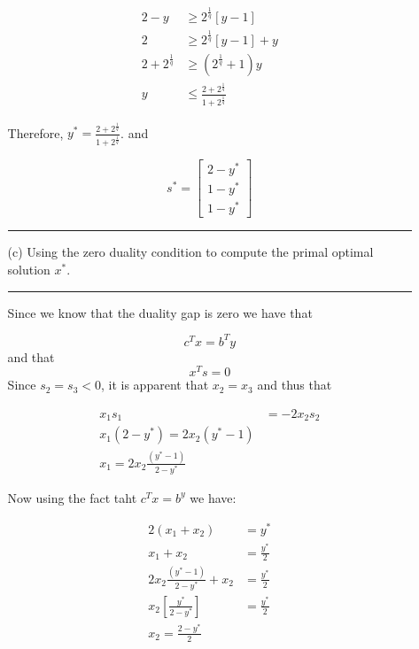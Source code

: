 \documentclass{article} %
\begin{document}
\begin{enumerate}
\begin{itemize}
\begin{equation*}
\begin{aligned}
2 - y &\geq 2^{\frac{1}{q}}[y - 1] \\ 
2 &\geq 2^{\frac{1}{q}}[y -1] + y \\ 
2 + 2^{\frac{1}{q}} &\geq (2^{\frac{1}{q}} + 1)y \\ 
y &\leq \frac{2 + 2^{\frac{1}{q}}}{1 + 2^{\frac{1}{q}}}
\end{aligned}
\end{equation*}

Therefore, $y^{*} = \frac{2 + 2^{\frac{1}{q}}}{1 + 2^{\frac{1}{q}}}$. and 

\[
s^{*} = \begin{bmatrix} 2 - y^{*} \\ 1 - y^{*} \\ 1 - y^{*}\end{bmatrix}
\]



\rule{\textwidth}{1pt}

\item[(c)] Using the zero duality condition to compute the primal optimal solution $x^*$.


\rule{\textwidth}{1pt}


Since we know that the duality gap is zero we have that 

\[
c^{T} x = b^{T} y
\]
and that 
\[
x^{T} s = 0
\]
Since $s_2 = s_3 < 0$, it is apparent that $x_2 = x_3$ and thus that 

\begin{equation*}
\begin{aligned}
x_1 s_1 &= -2 x_2 s_2 \\ 
x_1( 2- y^{*}) = 2 x_2 (y^{*} - 1) \\ 
x_1 = 2 x_2 \frac{(y^{*} - 1) }{ 2 - y^{*}}
\end{aligned}
\end{equation*}

Now using the fact taht $c^{T} x = b^y$ we have: 

\begin{equation*}
\begin{aligned}
2(x_1 + x_2) &= y^{*} \\ 
x_1 + x_2 &= \frac{y^{*}}{2} \\
2 x_2 \frac{(y^{*} - 1) }{ 2 - y^{*}} + x_2 &= \frac{y^{*}}{2}\\ 
x_2 [\frac{y^{*}}{2 - y^{*}}] &=  \frac{y^{*}}{2}\\ 
x_2 = \frac{2 - y^{*}}{2}
\end{aligned}
\end{equation*}


\end{itemize}
\end{enumerate}
\end{document}
